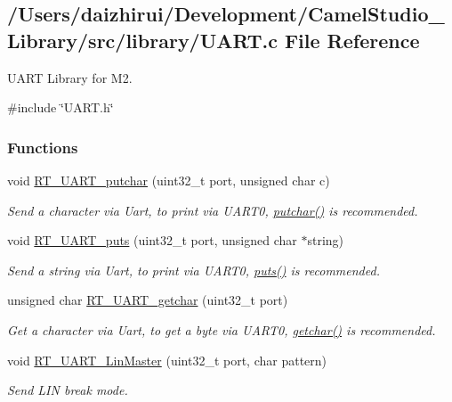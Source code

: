 \hypertarget{a00095}{}\subsection{/\+Users/daizhirui/\+Development/\+Camel\+Studio\+\_\+\+Library/src/library/\+U\+A\+RT.c File Reference}
\label{a00095}


U\+A\+RT Library for M2.  


{\ttfamily \#include \char`\"{}U\+A\+R\+T.\+h\char`\"{}}\newline
\subsubsection*{Functions}
\begin{DoxyCompactItemize}
\item 
void \mbox{\hyperlink{a00095_ab03e9e1a8d4d9b97583db27174086108}{R\+T\+\_\+\+U\+A\+R\+T\+\_\+putchar}} (uint32\+\_\+t port, unsigned char c)
\begin{DoxyCompactList}\small\item\em Send a character via Uart, to print via U\+A\+R\+T0, \mbox{\hyperlink{a00044_a948b7a0779c308ac5502c57e282e6933}{putchar()}} is recommended. \end{DoxyCompactList}\item 
void \mbox{\hyperlink{a00095_ad61c03a00ccd43875563c16f97d61af7}{R\+T\+\_\+\+U\+A\+R\+T\+\_\+puts}} (uint32\+\_\+t port, unsigned char $\ast$string)
\begin{DoxyCompactList}\small\item\em Send a string via Uart, to print via U\+A\+R\+T0, \mbox{\hyperlink{a00044_a46036bd75b920766eef64eb7910c887d}{puts()}} is recommended. \end{DoxyCompactList}\item 
unsigned char \mbox{\hyperlink{a00095_abc136df9d66fe27bf8ffcc319246591e}{R\+T\+\_\+\+U\+A\+R\+T\+\_\+getchar}} (uint32\+\_\+t port)
\begin{DoxyCompactList}\small\item\em Get a character via Uart, to get a byte via U\+A\+R\+T0, \mbox{\hyperlink{a00044_a0979671914792955a7a68461634ff82d}{getchar()}} is recommended. \end{DoxyCompactList}\item 
void \mbox{\hyperlink{a00095_ab0faf051e642e540b1b9c114eae242bd}{R\+T\+\_\+\+U\+A\+R\+T\+\_\+\+Lin\+Master}} (uint32\+\_\+t port, char pattern)
\begin{DoxyCompactList}\small\item\em Send L\+IN break mode. \end{DoxyCompactList}\end{DoxyCompactItemize}


